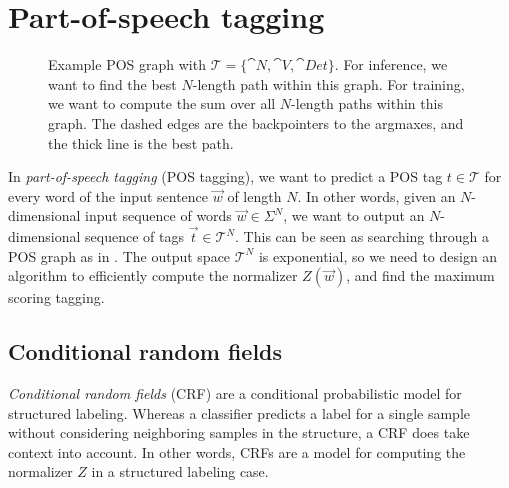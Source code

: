 \section{Part-of-speech tagging} \label{sec:pos-tagging}

\begin{figure}[h!]
    \centering
    \caption{Example POS graph with $\mathcal{T} = \{ \cat{N}, \cat{V},
            \cat{Det} \}$. For inference, we want to find the best $N$-length path
        within this graph. For training, we want to compute the sum over all
        $N$-length paths within this graph. The dashed edges are the backpointers to
        the argmaxes, and the thick line is the best path.}
    \label{fig:pos-graph}
\end{figure}

In \textit{part-of-speech tagging} (POS tagging), we want to predict a POS tag
$t\in\mathcal{T}$ for every word of the input sentence $\vec{w}$ of length $N$.
In other words, given an $N$-dimensional input sequence of words $\vec{w} \in
    \Sigma^N$, we want to output an $N$-dimensional sequence of tags $\vec{t} \in
    \mathcal{T}^N$. This can be seen as searching through a POS graph as in
. The output space $\mathcal{T}^N$ is exponential, so we
need to design an algorithm to efficiently compute the normalizer $Z(\vec{w})$,
and find the maximum scoring tagging.

\subsection{Conditional random fields}

\textit{Conditional random fields} (CRF) are a conditional probabilistic model
for structured labeling. Whereas a classifier predicts a label for a single
sample without considering neighboring samples in the structure, a CRF does
take context into account. In other words, CRFs are a model for computing the
normalizer $Z$ in a structured labeling case.



